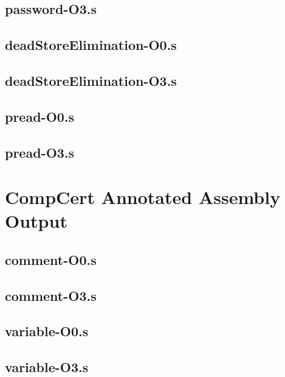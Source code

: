 \begin{appendices}
\subsection{password-O3.s}


\subsection{deadStoreElimination-O0.s}

\subsection{deadStoreElimination-O3.s}


\subsection{pread-O0.s}

\subsection{pread-O3.s}


\section{CompCert Annotated Assembly Output}
\label{app:compCertAnnotatedAssembly}
\lstset{language=[x64]Assembler}
\subsection{comment-O0.s}

\subsection{comment-O3.s}


\subsection{variable-O0.s}

\subsection{variable-O3.s}



\end{appendices}
